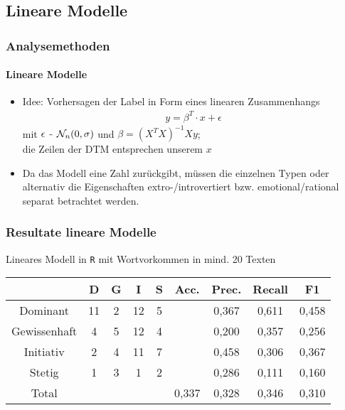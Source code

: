 \subsection{Lineare Modelle}
\begin{frame}
\frametitle{Analysemethoden}
\framesubtitle{Lineare Modelle}
\begin{itemize}\itemsep12pt
\item Idee: Vorhersagen der Label in Form eines linearen Zusammenhangs 
\begin{align*}
y=\beta^T\cdot x+\epsilon
\end{align*}
mit $\epsilon~\raisebox{-0.9ex}{\~{ }} ~ \mathcal{N}_{n}(0,\sigma)$ und $\beta=(X^TX)^{-1}Xy$;\\
die Zeilen der DTM entsprechen unserem $x$ 
\item Da das Modell eine Zahl zurückgibt, müssen die einzelnen Typen oder alternativ die Eigenschaften extro-/introvertiert bzw. emotional/rational separat betrachtet werden.
\end{itemize}
\end{frame}

\begin{frame}
\frametitle{Resultate lineare Modelle}
Lineares Modell in \texttt{R} mit Wortvorkommen in mind. 20 Texten\\
\vspace{12pt}
\begin{tabular}{|c|c|c|c|c|c|c|c|c|}
\hline
				& D 	& G	& I & S	& Acc.	& Prec. & Recall	& F1\\
\hline
Dominant 		& 11	& 2 & 12& 5 &      	& 0,367 & 0,611 	& 0,458\\
Gewissenhaft 	& 4 	& 5 & 12& 4 & 		& 0,200 & 0,357 	& 0,256\\
Initiativ 		& 2 	& 4	& 11& 7	& 		& 0,458	& 0,306 	& 0,367\\
Stetig 			& 1 	& 3 & 1 & 2 & 		& 0,286	& 0,111 	& 0,160\\
\hline
Total 			& 		& 	& 	& 	& 0,337	& 0,328 & 0,346  	& 0,310\\
\hline
\end{tabular}
\end{frame}


